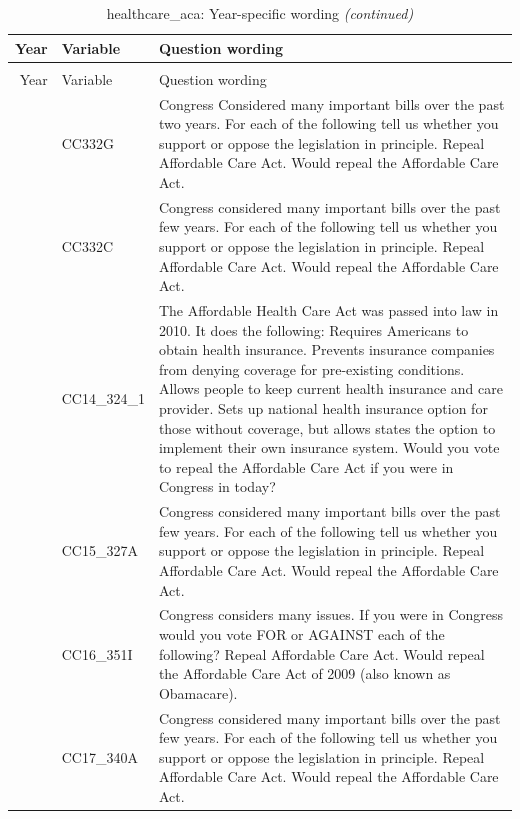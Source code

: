 \documentclass[
  12pt]{article}
\begin{document}
\begin{longtable}[t]{rl>{\raggedright\arraybackslash}p{10cm}}
\caption{\label{tab:unnamed-chunk-5}healthcare\_aca: Year-specific wording}\\
\toprule
Year & Variable & Question wording\\
\midrule
\endfirsthead
\caption[]{healthcare\_aca: Year-specific wording \textit{(continued)}}\\
\toprule
Year & Variable & Question wording\\
\midrule
\endhead

\endfoot
\bottomrule
\endlastfoot
2012 & CC332G & Congress Considered many important bills over the past two years. For each of the following tell us whether you support or oppose the legislation in principle. Repeal Affordable Care Act. Would repeal the Affordable Care Act.\\
\addlinespace
2013 & CC332C & Congress considered many important bills over the past few years. For each of the following tell us whether you support or oppose the legislation in principle. Repeal Affordable Care Act. Would repeal the Affordable Care Act.\\
\addlinespace
2014 & CC14\_324\_1 & The Affordable Health Care Act was passed into law in 2010. It does the following: Requires Americans to obtain health insurance. Prevents insurance companies from denying coverage for pre-existing conditions. Allows people to keep current health insurance and care provider. Sets up national health insurance option for those without coverage, but allows states the option to implement their own insurance system.  Would you vote to repeal the Affordable Care Act if you were in Congress in today?\\
\addlinespace
2015 & CC15\_327A & Congress considered many important bills over the past few years. For each of the following tell us whether you support or oppose the legislation in principle. Repeal Affordable Care Act. Would repeal the Affordable Care Act.\\
\addlinespace
2016 & CC16\_351I & Congress considers many issues. If you were in Congress would you vote FOR or AGAINST each of the following? Repeal Affordable Care Act. Would repeal the Affordable Care Act of 2009 (also known as Obamacare).\\
\addlinespace
2017 & CC17\_340A & Congress considered many important bills over the past few years. For each of the following tell us whether you support or oppose the legislation in principle. Repeal Affordable Care Act. Would repeal the Affordable Care Act.\\

\end{longtable}
\end{document}
